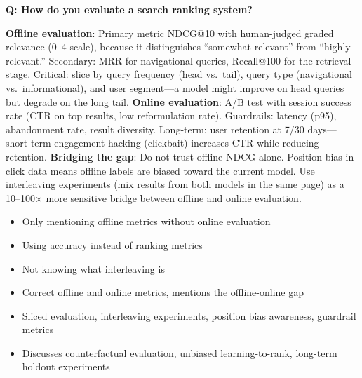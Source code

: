 \begin{interviewq}
\textbf{Q: How do you evaluate a search ranking system?}

 \quad {} \quad \badgefreq{\freqhigh}

\stronganswer \textbf{Offline evaluation}: Primary metric NDCG@10 with human-judged graded relevance (0--4 scale), because it distinguishes ``somewhat relevant'' from ``highly relevant.'' Secondary: MRR for navigational queries, Recall@100 for the retrieval stage. Critical: slice by query frequency (head vs.\ tail), query type (navigational vs.\ informational), and user segment---a model might improve on head queries but degrade on the long tail. \textbf{Online evaluation}: A/B test with session success rate (CTR on top results, low reformulation rate). Guardrails: latency (p95), abandonment rate, result diversity. Long-term: user retention at 7/30 days---short-term engagement hacking (clickbait) increases CTR while reducing retention. \textbf{Bridging the gap}: Do not trust offline NDCG alone. Position bias in click data means offline labels are biased toward the current model. Use interleaving experiments (mix results from both models in the same page) as a 10--100$\times$ more sensitive bridge between offline and online evaluation.

\redflags
\begin{itemize}
    \item Only mentioning offline metrics without online evaluation
    \item Using accuracy instead of ranking metrics
    \item Not knowing what interleaving is
\end{itemize}


\goodgreat
\begin{itemize}
    \item {} Correct offline and online metrics, mentions the offline-online gap
    \item {} Sliced evaluation, interleaving experiments, position bias awareness, guardrail metrics
    \item {} Discusses counterfactual evaluation, unbiased learning-to-rank, long-term holdout experiments
\end{itemize}

\end{interviewq}

